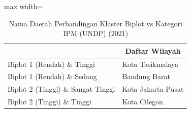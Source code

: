 \begin{table}[H]
\centering
\caption{Nama Daerah Perbandingan Klaster Biplot vs Kategori IPM (UNDP) (2021)} \label{tab:sample1crossname2021}
\begin{adjustbox}{max width=\textwidth}
\begin{tabular}{|>{\centering\arraybackslash}p{4cm}|p{10cm}|}
\hline
\multicolumn{1}{|c|}{\textbf{Kategori}} & \multicolumn{1}{c|}{\textbf{Daftar Wilayah}} \\
\hline
Biplot 1 (Rendah) \& Tinggi & Kota Tasikmalaya \\
\hline
Biplot 1 (Rendah) \& Sedang & Bandung Barat \\
\hline
Biplot 2 (Tinggi) \& Sangat Tinggi & Kota Jakarta Pusat \\
\hline
Biplot 2 (Tinggi) \& Tinggi & Kota Cilegon \\
\hline
\end{tabular}
\end{adjustbox}
\end{table}